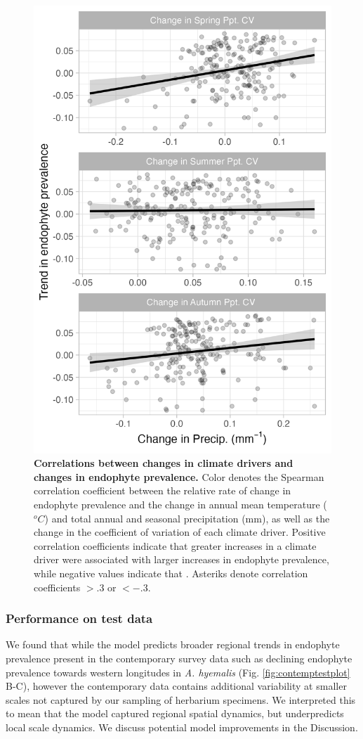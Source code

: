 \documentclass[11pt]{article}
\begin{document}
\begin{figure}[H]
	\centering
	\includegraphics[width = .7\linewidth]{ppt_CV_regression_plot_ESA.png}
	\caption{\textbf{Correlations between changes in climate drivers and changes in endophyte prevalence.} Color denotes the Spearman correlation coefficient between the relative rate of change in endophyte prevalence and the change in annual mean temperature ($^oC$) and total annual and seasonal precipitation (mm), as well as the change in the coefficient of variation of each climate driver. Positive correlation coefficients indicate that greater increases in a climate driver were associated with larger increases in endophyte prevalence, while negative values indicate that . Asteriks denote correlation coefficients $> .3$ or $< -.3$.}
\end{figure}



\subsubsection*{Performance on test data}
We found that while the model predicts broader regional trends in endophyte prevalence present in the contemporary survey data such as declining endophyte prevalence towards western longitudes in \emph{A. hyemalis} (Fig. \ref{fig:contemptestplot} B-C), however the contemporary data contains additional variability at smaller scales not captured by our sampling of herbarium specimens.
We interpreted this to mean that the model captured regional spatial dynamics, but underpredicts local scale dynamics. 
We discuss potential model improvements in the Discussion.
\end{document}

